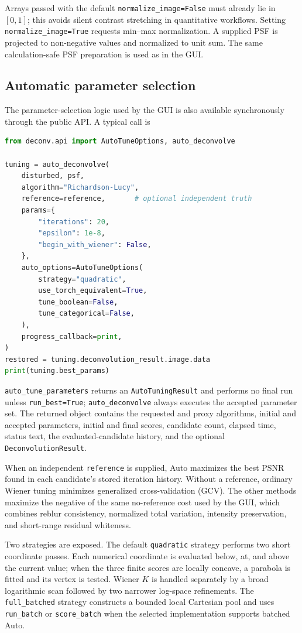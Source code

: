 \documentclass[10pt,a4paper]{article}
\newcommand{\code}[1]{\texttt{#1}}
\begin{document}
Arrays passed with the default \code{normalize\_image=False} must already lie in $[0,1]$; this avoids silent contrast stretching in quantitative workflows.  Setting \code{normalize\_image=True} requests min--max normalization.  A supplied PSF is projected to non-negative values and normalized to unit sum.  The same calculation-safe PSF preparation is used as in the GUI.

\subsection{Automatic parameter selection}
The parameter-selection logic used by the GUI is also available synchronously through the public API.  A typical call is
\begin{lstlisting}[language=Python]
from deconv.api import AutoTuneOptions, auto_deconvolve

tuning = auto_deconvolve(
    disturbed, psf,
    algorithm="Richardson-Lucy",
    reference=reference,       # optional independent truth
    params={
        "iterations": 20,
        "epsilon": 1e-8,
        "begin_with_wiener": False,
    },
    auto_options=AutoTuneOptions(
        strategy="quadratic",
        use_torch_equivalent=True,
        tune_boolean=False,
        tune_categorical=False,
    ),
    progress_callback=print,
)
restored = tuning.deconvolution_result.image.data
print(tuning.best_params)
\end{lstlisting}
\code{auto\_tune\_parameters} returns an \code{AutoTuningResult} and performs no final run unless \code{run\_best=True}; \code{auto\_deconvolve} always executes the accepted parameter set.  The returned object contains the requested and proxy algorithms, initial and accepted parameters, initial and final scores, candidate count, elapsed time, status text, the evaluated-candidate history, and the optional \code{DeconvolutionResult}.

When an independent \code{reference} is supplied, Auto maximizes the best PSNR found in each candidate's stored iteration history.  Without a reference, ordinary Wiener tuning minimizes generalized cross-validation (GCV).  The other methods maximize the negative of the same no-reference cost used by the GUI, which combines reblur consistency, normalized total variation, intensity preservation, and short-range residual whiteness.

Two strategies are exposed.  The default \code{quadratic} strategy performs two short coordinate passes.  Each numerical coordinate is evaluated below, at, and above the current value; when the three finite scores are locally concave, a parabola is fitted and its vertex is tested.  Wiener $K$ is handled separately by a broad logarithmic scan followed by two narrower log-space refinements.  The \code{full\_batched} strategy constructs a bounded local Cartesian pool and uses \code{run\_batch} or \code{score\_batch} when the selected implementation supports batched Auto.
\end{document}
